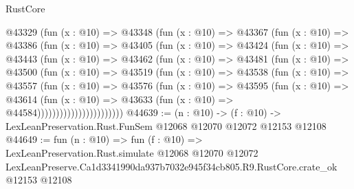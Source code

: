 \begin{lexlean}{RustCore}
\begin{coremodule}
              @43329
                (fun (x : @10) =>
                @43348
                  (fun (x : @10) =>
                  @43367
                    (fun (x : @10) =>
                    @43386
                      (fun (x : @10) =>
                      @43405
                        (fun (x : @10) =>
                        @43424
                          (fun (x : @10) =>
                          @43443
                            (fun (x : @10) =>
                            @43462
                              (fun (x : @10) =>
                              @43481
                                (fun (x : @10) =>
                                @43500
                                  (fun (x : @10) =>
                                  @43519
                                    (fun (x : @10) =>
                                    @43538
                                      (fun (x : @10) =>
                                      @43557
                                        (fun (x : @10) =>
                                        @43576
                                          (fun (x : @10) =>
                                          @43595
                                            (fun (x : @10) =>
                                            @43614
                                              (fun (x : @10) =>
                                              @43633 (fun (x : @10) => @44584)))))))))))))))))))))))
@44639 := (n : @10) ->
  (f : @10) -> LexLeanPreservation.Rust.FunSem @12068 @12070 @12072 @12153 @12108
@44649 := fun (n : @10) =>
  fun (f : @10) =>
  LexLeanPreservation.Rust.simulate
    @12068
    @12070
    @12072
    LexLeanPreserve.Ca1d3341990da937b7032e945f34cb805.R9.RustCore.crate_ok
    @12153
    @12108
\end{coremodule}
\end{lexlean}

